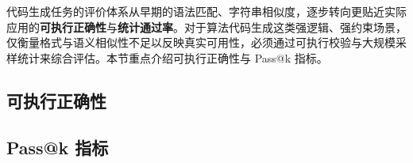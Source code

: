 
代码生成任务的评价体系从早期的语法匹配、字符串相似度，逐步转向更贴近实际应用的\textbf{可执行正确性}与\textbf{统计通过率}。对于算法代码生成这类强逻辑、强约束场景，仅衡量格式与语义相似性不足以反映真实可用性，必须通过可执行校验与大规模采样统计来综合评估。本节重点介绍可执行正确性与 Pass@k 指标。

\subsection{可执行正确性}


\subsection{Pass@k 指标}
